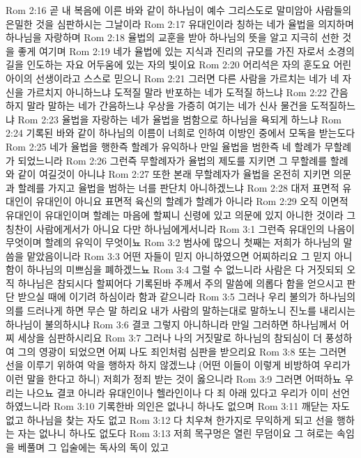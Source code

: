 Rom 2:16  곧 내 복음에 이른 바와 같이 하나님이 예수 그리스도로 말미암아 사람들의 은밀한 것을 심판하시는 그날이라
Rom 2:17  유대인이라 칭하는 네가 율법을 의지하며 하나님을 자랑하며
Rom 2:18  율법의 교훈을 받아 하나님의 뜻을 알고 지극히 선한 것을 좋게 여기며
Rom 2:19  네가 율법에 있는 지식과 진리의 규모를 가진 자로서 소경의 길을 인도하는 자요 어두움에 있는 자의 빛이요
Rom 2:20  어리석은 자의 훈도요 어린 아이의 선생이라고 스스로 믿으니
Rom 2:21  그러면 다른 사람을 가르치는 네가 네 자신을 가르치지 아니하느냐 도적질 말라 반포하는 네가 도적질 하느냐
Rom 2:22  간음하지 말라 말하는 네가 간음하느냐 우상을 가증히 여기는 네가 신사 물건을 도적질하느냐
Rom 2:23  율법을 자랑하는 네가 율법을 범함으로 하나님을 욕되게 하느냐
Rom 2:24  기록된 바와 같이 하나님의 이름이 너희로 인하여 이방인 중에서 모독을 받는도다
Rom 2:25  네가 율법을 행한즉 할례가 유익하나 만일 율법을 범한즉 네 할례가 무할례가 되었느니라
Rom 2:26  그런즉 무할례자가 율법의 제도를 지키면 그 무할례를 할례와 같이 여길것이 아니냐
Rom 2:27  또한 본래 무할례자가 율법을 온전히 지키면 의문과 할례를 가지고 율법을 범하는 너를 판단치 아니하겠느냐
Rom 2:28  대저 표면적 유대인이 유대인이 아니요 표면적 육신의 할례가 할례가 아니라
Rom 2:29  오직 이면적 유대인이 유대인이며 할례는 마음에 할찌니 신령에 있고 의문에 있지 아니한 것이라 그 칭찬이 사람에게서가 아니요 다만 하나님에게서니라
Rom 3:1  그런즉 유대인의 나음이 무엇이며 할례의 유익이 무엇이뇨
Rom 3:2  범사에 많으니 첫째는 저희가 하나님의 말씀을 맡았음이니라
Rom 3:3  어떤 자들이 믿지 아니하였으면 어찌하리요 그 믿지 아니함이 하나님의 미쁘심을 폐하겠느뇨
Rom 3:4  그럴 수 없느니라 사람은 다 거짓되되 오직 하나님은 참되시다 할찌어다 기록된바 주께서 주의 말씀에 의롭다 함을 얻으시고 판단 받으실 때에 이기려 하심이라 함과 같으니라
Rom 3:5  그러나 우리 불의가 하나님의 의를 드러나게 하면 무슨 말 하리요 내가 사람의 말하는대로 말하노니 진노를 내리시는 하나님이 불의하시냐
Rom 3:6  결코 그렇지 아니하니라 만일 그러하면 하나님께서 어찌 세상을 심판하시리요
Rom 3:7  그러나 나의 거짓말로 하나님의 참되심이 더 풍성하여 그의 영광이 되었으면 어찌 나도 죄인처럼 심판을 받으리요
Rom 3:8  또는 그러면 선을 이루기 위하여 악을 행하자 하지 않겠느냐 (어떤 이들이 이렇게 비방하여 우리가 이런 말을 한다고 하니) 저희가 정죄 받는 것이 옳으니라
Rom 3:9  그러면 어떠하뇨 우리는 나으뇨 결코 아니라 유대인이나 헬라인이나 다 죄 아래 있다고 우리가 이미 선언하였느니라
Rom 3:10  기록한바 의인은 없나니 하나도 없으며
Rom 3:11  깨닫는 자도 없고 하나님을 찾는 자도 없고
Rom 3:12  다 치우쳐 한가지로 무익하게 되고 선을 행하는 자는 없나니 하나도 없도다
Rom 3:13  저희 목구멍은 열린 무덤이요 그 혀로는 속임을 베풀며 그 입술에는 독사의 독이 있고
